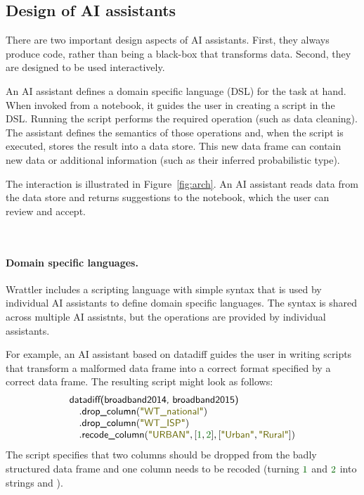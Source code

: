 \documentclass[sigplan,preprint,10pt]{acmart}\settopmatter{printfolios=true,printccs=false,printacmref=false}
\theoremstyle{plain}
\theoremstyle{definition}
\newcommand{\num}[1]{\textcolor{numclr}{#1}}
\newcommand{\str}[1]{\textnormal{\textcolor{strclr}{\sffamily "#1"}}}
\newcommand{\ident}[1]{\textnormal{\sffamily #1}}
\begin{document}
\subsection{Design of AI assistants}
There are two important design aspects of AI assistants. First, they always produce code, rather
than being a black-box that transforms data. Second, they are designed to be used interactively. 

An AI assistant defines a domain specific language (DSL) for the task at hand. When invoked from 
a notebook, it guides the user in creating a script in the DSL. Running the script performs
the required operation (such as data cleaning). The assistant defines the semantics
of those operations and, when the script is executed, stores the result into a data
store. This new data frame can contain new data or additional information (such as their
inferred probabilistic type).

The interaction is illustrated in Figure~\ref{fig:arch}. An AI assistant reads data from the data
store and returns suggestions to the notebook, which the user can review and accept. 

~

\paragraph{Domain specific languages.}

Wrattler includes a scripting language with simple syntax that is used by individual AI assistants
to define domain specific languages. The syntax is shared across multiple AI assistnts, but the
operations are provided by individual assistants. 

For example, an AI assistant based on datadiff
guides the user in writing scripts that transform a malformed data frame into a correct format
specified by a correct data frame. The resulting script might look as follows:
%
\begin{equation*}
\begin{array}{l}
\ident{datadiff(broadband2014, broadband2015)}\\
\quad.\ident{drop\_column}(\str{WT\_national})\\
\quad.\ident{drop\_column}(\str{WT\_ISP})\\
\quad.\ident{recode\_column}(\str{URBAN}, [\num{1}, \num{2}], [\str{Urban},\str{Rural}])
\end{array}  
\end{equation*}
%
The script specifies that two columns should be dropped from the badly structured data frame and
one column needs to be recoded (turning $\num{1}$ and $\num{2}$ into strings
 and ).
\end{document}
